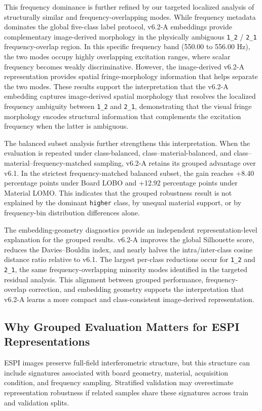\documentclass[review,3p,times]{elsarticle}
\begin{document}
This frequency dominance is further refined by our targeted localized analysis of structurally similar and frequency-overlapping modes. While frequency metadata dominates the global five-class label protocol, v6.2-A embeddings provide complementary image-derived morphology in the physically ambiguous \texttt{1\_2} / \texttt{2\_1} frequency-overlap region. In this specific frequency band (550.00 to 556.00 Hz), the two modes occupy highly overlapping excitation ranges, where scalar frequency becomes weakly discriminative. However, the image-derived v6.2-A representation provides spatial fringe-morphology information that helps separate the two modes. These results support the interpretation that the v6.2-A embedding captures image-derived spatial morphology that resolves the localized frequency ambiguity between \texttt{1\_2} and \texttt{2\_1}, demonstrating that the visual fringe morphology encodes structural information that complements the excitation frequency when the latter is ambiguous.

The balanced subset analysis further strengthens this interpretation. When the evaluation is repeated under class-balanced, class--material-balanced, and class--material--frequency-matched sampling, v6.2-A retains its grouped advantage over v6.1. In the strictest frequency-matched balanced subset, the gain reaches +8.40 percentage points under Board LOBO and +12.92 percentage points under Material LOMO. This indicates that the grouped robustness result is not explained by the dominant \texttt{higher} class, by unequal material support, or by frequency-bin distribution differences alone.

The embedding-geometry diagnostics provide an independent representation-level explanation for the grouped results. v6.2-A improves the global Silhouette score, reduces the Davies--Bouldin index, and nearly halves the intra/inter-class cosine distance ratio relative to v6.1. The largest per-class reductions occur for \texttt{1\_2} and \texttt{2\_1}, the same frequency-overlapping minority modes identified in the targeted residual analysis. This alignment between grouped performance, frequency-overlap correction, and embedding geometry supports the interpretation that v6.2-A learns a more compact and class-consistent image-derived representation.

\subsection{Why Grouped Evaluation Matters for ESPI Representations}
ESPI images preserve full-field interferometric structure, but this structure can include signatures associated with board geometry, material, acquisition condition, and frequency sampling. Stratified validation may overestimate representation robustness if related samples share these signatures across train and validation splits.
\end{document}
